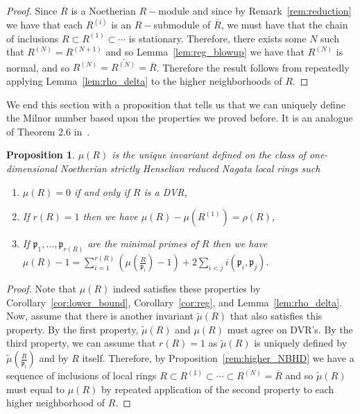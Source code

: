 \documentclass{article}
\newtheorem{proposition}[theorem]{Proposition}
\numberwithin{theorem}{section}
\begin{document}
\begin{proof}
    Since $\overline{R}$ is a Noetherian $R-$module and since by Remark~\ref{rem:reduction} we have that each $R^{(i)}$ is an $R-$submodule of $\overline{R}$, we must have that the chain of inclusions $R \subset R^{(1)} \subset \cdots $ is stationary. Therefore, there exists some $N$ such that $R^{(N)} = R^{(N+1)}$ and so Lemma~\ref{lem:reg_blowup} we have that  $R^{(N)}$ is normal, and so $R^{(N)}=\overline{R^{(N)}}=\overline{R}$. Therefore the result follows from repeatedly applying Lemma~\ref{lem:rho_delta} to the higher neighborhoods of $R$. 
\end{proof}

We end this section with a proposition that tells us that we can uniquely define the Milnor number based upon the properties we proved before. It is an analogue of Theorem 2.6 in~\cite{ploski1995milnor}. 

\begin{proposition}\label{prop:uniqueness}
    $\mu(R)$ is the unique invariant defined on the class of one-dimensional Noetherian strictly Henselian reduced Nagata local rings such 
    \begin{enumerate}
        \item $\mu(R)=0$ if and only if $R$ is a DVR, 
        \item If $r(R)=1$ then  we have $\mu(R)-\mu(R^{(1)})  = \rho(R)$, 
        \item If $\mathfrak{p}_1, \dots, \mathfrak{p}_{r(R)}$ are the minimal primes of $R$ then we have $\mu(R) -1 = \sum_{i=1}^{r(R)} \left(\mu\left(\frac{R}{\mathfrak{p}_i}\right)-1\right) + 2\sum_{i <  j} i(\mathfrak{p}_i, \mathfrak{p}_j)$.
    \end{enumerate}
\end{proposition}

\begin{proof}
    Note that $\mu(R)$ indeed satisfies these properties by Corollary~\ref{cor:lower_bound},  Corollary~\ref{cor:reg}, and Lemma~\ref{lem:rho_delta}.
    Now, assume that there is another invariant $\tilde{\mu}(R)$ that also satisfies this property. By the first property, $\tilde{\mu}(R)$ and $\mu(R)$ must agree on DVR's. By the third property, we can assume that $r(R)=1$ as $\tilde{\mu}(R)$ is uniquely defined by $\tilde{\mu}\left(\frac{R}{\mathfrak{p}_i}\right)$ and by $R$ itself.
    Therefore, by Proposition~\ref{rem:higher_NBHD} we have a sequence of inclusions of local rings $R \subset R^{(1)} \subset \cdots \subset R^{(N)} = \overline{R}$ and so $\tilde{\mu}(R)$ must equal to $\mu(R)$ by repeated application of the second property to each higher neighborhood of $R$. 
\end{proof}
\end{document}
